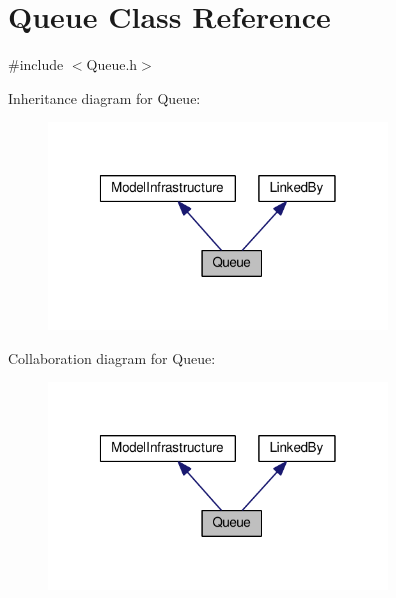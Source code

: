 \hypertarget{class_queue}{\section{Queue Class Reference}
\label{class_queue}
}


{\ttfamily \#include $<$Queue.\-h$>$}



Inheritance diagram for Queue\-:\nopagebreak
\begin{figure}[H]
\begin{center}
\leavevmode
\includegraphics[width=255pt]{class_queue__inherit__graph}
\end{center}
\end{figure}


Collaboration diagram for Queue\-:\nopagebreak
\begin{figure}[H]
\begin{center}
\leavevmode
\includegraphics[width=255pt]{class_queue__coll__graph}
\end{center}
\end{figure}
